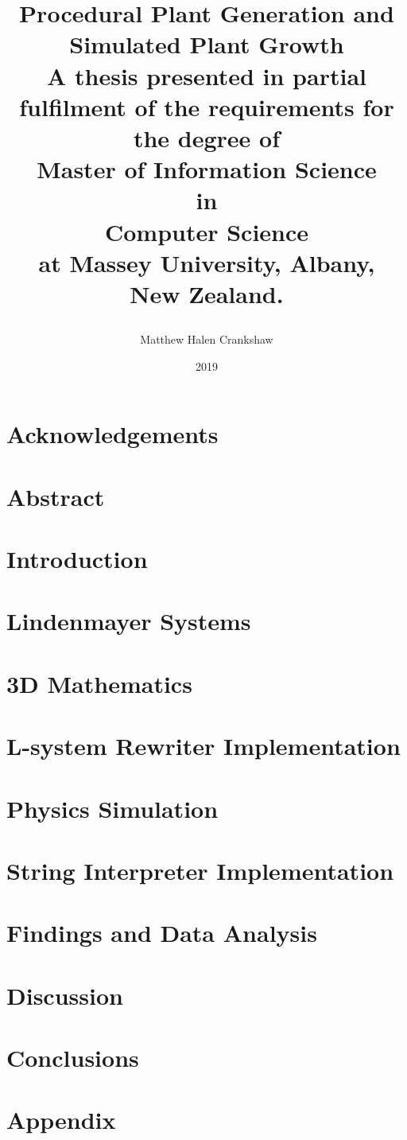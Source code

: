 \documentclass[11pt, twoside]{report}
\title{
{\huge Procedural Plant Generation and Simulated Plant Growth }\\
\vspace{3cm}
{\large A thesis presented in partial fulfilment of the requirements for the degree of \\
\vspace{4cm}
\large Master of Information Science\\
\large in\\
\large Computer Science\\
\vspace{4cm}
\large at Massey University, Albany, \\
\large New Zealand. }
\vspace{3cm}
\author{Matthew Halen Crankshaw}
\date{2019}
}
\begin{document}
\maketitle

\chapter*{Acknowledgements}

\chapter*{Abstract}

\tableofcontents
\listoffigures
\listoftables


\chapter{Introduction}


\chapter{Lindenmayer Systems}  \label{l-system chapter} 


\chapter{3D Mathematics}


\chapter{L-system Rewriter Implementation}


\chapter{Physics Simulation}


\chapter{String Interpreter Implementation}


\chapter{Findings and Data Analysis}


\chapter{Discussion}


\chapter{Conclusions}


\printglossary[type=\acronymtype]
\printglossary

\appendix
\chapter{Appendix}

\end{document}
